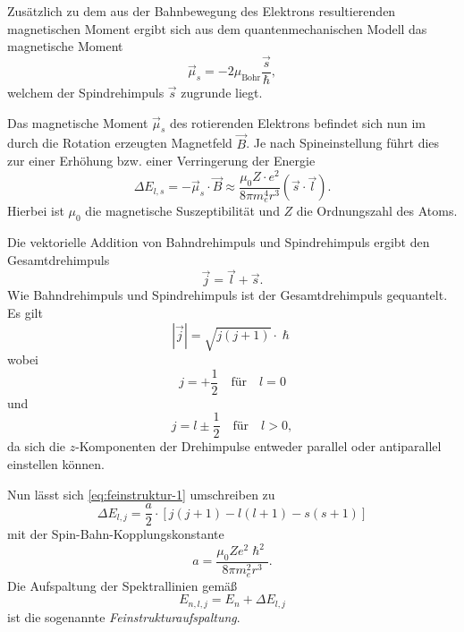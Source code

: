 \documentclass[../bericht.tex]{subfiles}
\begin{document}
      Zusätzlich zu dem aus der Bahnbewegung des Elektrons resultierenden magnetischen Moment ergibt sich aus dem quantenmechanischen Modell das magnetische Moment
      \begin{equation*}
        \vec{\mu}_s=-2\mu_\mathrm{Bohr}\frac{\vec{s}}{\hslash},
      \end{equation*}
      welchem der Spindrehimpuls $\vec{s}$ zugrunde liegt.

      Das magnetische Moment $\vec{\mu}_s$ des rotierenden Elektrons befindet sich nun im durch die Rotation erzeugten Magnetfeld $\vec{B}$. Je nach Spineinstellung führt dies zur einer Erhöhung bzw. einer Verringerung der Energie
      \begin{equation}
        \Delta E_{l,s}=-\vec{\mu}_s\cdot \vec{B}\approx \frac{\mu_0Z\cdot e^2}{8\pi m_e^4r^3}\left( \vec{s}\cdot \vec{l}\right).
        \label{eq:feinstruktur-1}
      \end{equation}
      Hierbei ist $\mu_0$ die magnetische Suszeptibilität und $Z$ die Ordnungszahl des Atoms.

      Die vektorielle Addition von Bahndrehimpuls und Spindrehimpuls ergibt den Gesamtdrehimpuls
      \begin{equation*}
        \vec{j}=\vec{l}+\vec{s}.
      \end{equation*}
      Wie Bahndrehimpuls und Spindrehimpuls ist der Gesamtdrehimpuls gequantelt. Es gilt
      \begin{equation*}
        |\vec{j}|=\sqrt{j(j+1)}\cdot \hslash
      \end{equation*}
      wobei
      \begin{equation*}
        j=+\frac{1}{2} \quad \text{für} \quad l=0
      \end{equation*}
      und
      \begin{equation*}
        j=l\pm \frac{1}{2} \quad \text{für} \quad l>0,
      \end{equation*}
      da sich die $z$-Komponenten der Drehimpulse entweder parallel oder antiparallel einstellen können.

      Nun lässt sich \eqref{eq:feinstruktur-1} umschreiben zu
      \begin{equation}
        \Delta E_{l,j}=\frac{a}{2}\cdot \left[j(j+1)-l(l+1)-s(s+1)\right]
      \end{equation}
      mit der Spin-Bahn-Kopplungskonstante
      \begin{equation*}
        a=\frac{\mu_0 Z e^2\hslash ^2}{8\pi m_e^2r^3}.
      \end{equation*}
      Die Aufspaltung der Spektrallinien gemä\ss
      \begin{equation}
        E_{n,l,j}=E_n + \Delta E_{l,j}
      \end{equation}
      ist die sogenannte \textit{Feinstrukturaufspaltung}.
\end{document}
